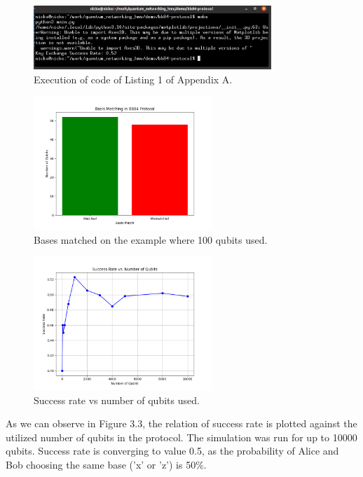 \documentclass[12pt,a4paper] {report}
\begin{document}
		\begin{figure}[h!]
			\centering
			\includegraphics[width=0.8\textwidth]{bb84/success_rate_terminal.png}
			\caption{Execution of code of Listing 1 of Appendix A.}
			\label{fig:}
		\end{figure}		

		\begin{figure}[h!]
			\centering
			\includegraphics[width=0.6\textwidth]{bb84/basis_matching.png}
			\caption{Bases matched on the example where 100 qubits used.}
			\label{fig:}
		\end{figure}		


		\begin{figure}[h!]
			\centering
			\includegraphics[width=0.6\textwidth]{bb84/success_rate_vs_num_qubits.png}
			\caption{Success rate vs number of qubits used.}
			\label{fig:}
		\end{figure}		

		As we can observe in Figure 3.3, the relation of success rate is plotted against the utilized 
		number of qubits in the protocol. The simulation was run for up to 10000 qubits. 
		Success rate is converging to value 0.5, as the probability 
		of Alice and Bob choosing the same base ('x' or 'z') is 50\%.
\end{document}
